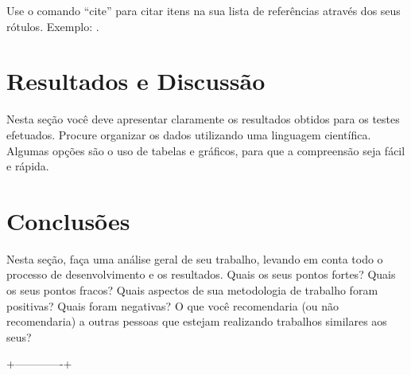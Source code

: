 \documentclass[twoside,conference,a4paper]{IEEEtran}
\begin{document}
Use o comando ``cite'' para citar itens na sua lista de
referências através dos seus rótulos. Exemplo: \cite{Rowling:1997}\cite{Reynolds:2009a}\cite{Michalowski:2006}.


\section{Resultados e Discussão}

Nesta seção você deve apresentar claramente os resultados obtidos para os testes efetuados. Procure organizar os dados utilizando uma linguagem científica. Algumas opções são o uso de tabelas e gráficos, para que a compreensão seja fácil e rápida. 

\section{Conclusões}

Nesta seção, faça uma análise geral de seu trabalho, levando em conta todo o processo de desenvolvimento e os resultados. Quais os seus pontos fortes? Quais os seus pontos fracos? Quais aspectos de sua metodologia de trabalho foram positivas? Quais foram negativas? O que você recomendaria (ou não recomendaria) a outras pessoas que estejam realizando trabalhos similares aos seus? 


 +-------------+






\end{document}

